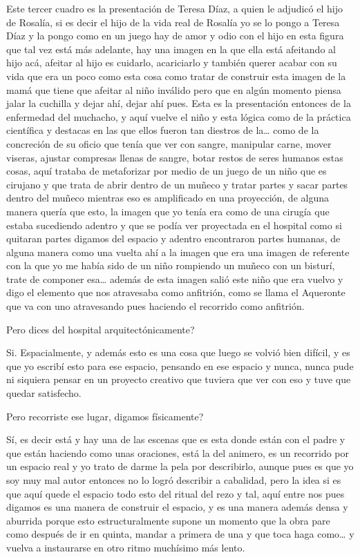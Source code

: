 Este tercer cuadro es la presentación de Teresa Díaz, a quien le adjudicó el hijo de Rosalía, si es decir el hijo de la vida real de Rosalía yo se lo pongo a Teresa Díaz y la pongo como en un juego hay de amor y odio con el hijo en esta figura que tal vez está más adelante, hay una imagen en la que ella está afeitando al hijo acá, afeitar al hijo es cuidarlo, acariciarlo y también querer acabar con su vida que era un poco como esta cosa como tratar de construir esta imagen de la mamá que tiene que afeitar al niño inválido pero que en algún momento piensa jalar la cuchilla y dejar ahí, dejar ahí pues.
Esta es la presentación entonces de la enfermedad del muchacho, y aquí vuelve el niño y esta lógica como de la práctica científica y destacas en las que ellos fueron tan diestros de la… como de la  concreción de su oficio que tenía que ver con sangre, manipular carne, mover viseras, ajustar compresas llenas de sangre, botar restos de seres humanos estas cosas, aquí trataba de metaforizar por medio de un juego de un niño que es cirujano y que trata de abrir dentro de un muñeco y tratar partes y sacar partes dentro del muñeco mientras eso es amplificado en una proyección, de alguna manera quería que esto, la imagen que yo tenía era como de una cirugía que estaba sucediendo adentro y que se podía ver proyectada en el hospital como si quitaran partes digamos del espacio y adentro encontraron partes humanas, de alguna manera como una vuelta ahí a la imagen que era una imagen de referente con la que yo me había sido de un niño rompiendo un muñeco con un bisturí, trate de componer esa… además de esta imagen salió este niño que era vuelvo y digo el elemento que nos atravesaba como anfitrión, como se llama el Aqueronte que va con uno atravesando pues haciendo el recorrido como anfitrión.

Pero dices del hospital arquitectónicamente?

Si. Espacialmente, y además esto es una cosa que luego se volvió bien difícil, y es que yo escribí esto para ese espacio, pensando en ese espacio y nunca, nunca pude ni siquiera pensar en un proyecto creativo que tuviera que ver con eso y tuve que quedar satisfecho.

Pero recorriste ese lugar, digamos físicamente?

Sí, es decir está y hay una de las escenas que es esta donde están con el padre y que están haciendo como unas oraciones, está la del animero, es un recorrido por un espacio real y yo trato de darme la pela por describirlo, aunque pues es que yo soy muy mal autor entonces no lo logró describir a cabalidad, pero la idea si es que aquí quede el espacio todo esto del ritual del rezo y tal, aquí entre nos pues digamos es una manera de construir el espacio, y es una manera además densa y aburrida porque esto estructuralmente supone un momento que la obra pare como después de ir en quinta, mandar a primera de una y que toca haga como… y vuelva a instaurarse en otro ritmo muchísimo más lento.


